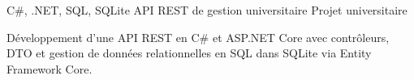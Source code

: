 
\begin{cventries}
  \cventry
    {C\#, .NET, SQL, SQLite}
    {API REST de gestion universitaire}
    {Projet universitaire}
    {}
    {
      \begin{cvitems}
        \item {Développement d’une API REST en C\# et ASP.NET Core avec contrôleurs, DTO et gestion de données relationnelles en SQL dans SQLite via Entity Framework Core.}
      \end{cvitems}
    }
\end{cventries}
